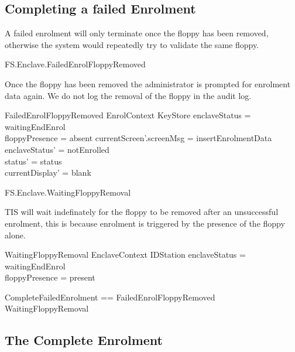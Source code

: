 \subsection{Completing a failed Enrolment}

A failed enrolment will only terminate once the floppy has been
removed, otherwise the system would repeatedly try to validate the
same floppy.

\begin{traceunit}{FS.Enclave.FailedEnrolFloppyRemoved}
\end{traceunit}


Once the floppy has been removed the administrator is prompted for
enrolment data again. We do not log the removal of the floppy in the
audit log.

\begin{schema}{FailedEnrolFloppyRemoved}
        EnrolContext
\also
        \Xi KeyStore
\where
        enclaveStatus = waitingEndEnrol
\\      floppyPresence = absent
\also
        currentScreen'.screenMsg = insertEnrolmentData
\also
        enclaveStatus' = notEnrolled
\\      status' = status
\\      currentDisplay' = blank
\end{schema}

\begin{traceunit}{FS.Enclave.WaitingFloppyRemoval}
\end{traceunit}

TIS will wait indefinately for the floppy to be removed after an
unsuccessful enrolment, this is because enrolment is triggered by the
presence of the floppy alone.

\begin{schema}{WaitingFloppyRemoval}
        EnclaveContext
\also
        \Xi IDStation
\where
        enclaveStatus = waitingEndEnrol
\\      floppyPresence = present
\end{schema}

\begin{zed}
        CompleteFailedEnrolment == FailedEnrolFloppyRemoved  
         \lor WaitingFloppyRemoval
\end{zed}

\subsection{The Complete Enrolment}

